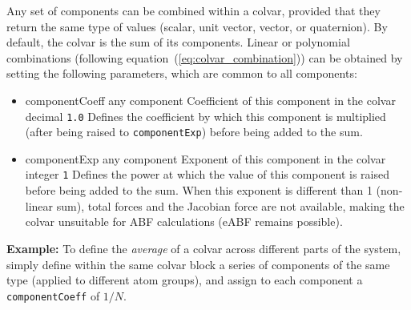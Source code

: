 Any set of components can be combined within a colvar, provided that
they return the same type of values (scalar, unit vector, vector, or
quaternion).  By default, the colvar is the sum of its components.
Linear or polynomial combinations (following
equation~(\ref{eq:colvar_combination})) can be obtained by setting the
following parameters, which are common to all components:
\begin{itemize}
\item %
  \keydef
    {componentCoeff}{%
    any component}{%
    Coefficient of this component in the colvar}{%
    decimal}{%
    \texttt{1.0}}{%
    Defines the coefficient by which this component is multiplied
    (after being raised to \texttt{componentExp}) before being added
    to the sum.}

\item %
  \keydef
    {componentExp}{%
    any component}{%
    Exponent of this component in the colvar}{%
    integer}{%
    \texttt{1}}{%
    Defines the power at which the value of this component is raised
    before being added to the sum.  When this exponent is
    different than 1 (non-linear sum), total forces and the Jacobian
    force are not available, making the colvar unsuitable for ABF calculations
    (eABF remains possible).}
\end{itemize}

\textbf{Example:} To define the \emph{average} of a colvar across
different parts of the system, simply define within the same colvar
block a series of components of the same type (applied to different
atom groups), and assign to each component a \texttt{componentCoeff}
of $1/N$.


